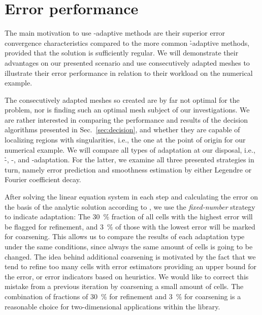 \section{Error performance}
\label{sec:errorvsperformance}



The main motivation to use \hp-adaptive methods are their superior error convergence characteristics compared to the more common \h-adaptive methods, provided that the solution is sufficiently regular. We will demonstrate their advantages on our presented scenario and use consecutively adapted meshes to illustrate their error performance in relation to their workload on the numerical example.


The consecutively adapted meshes so created are by far not optimal for the problem, nor is finding such an optimal mesh subject of our investigations. We are rather interested in comparing the performance and results of the decision algorithms presented in Sec.~\ref{sec:decision}, and whether they are capable of localizing regions with singularities, i.e., the one at the point of origin for our numerical example. We will compare all types of adaptation at our disposal, i.e., \h-, \p-, and \hp-adaptation. For the latter, we examine all three presented strategies in turn, namely error prediction and smoothness estimation by either Legendre or Fourier coefficient decay.

After solving the linear equation system in each step and calculating the error on the basis of the analytic solution according to \textcite{kelly1983,davydov2017}, we use the \textit{fixed-number} strategy to indicate adaptation: The \SI{30}{\percent} fraction of all cells with the highest error will be flagged for refinement, and \SI{3}{\percent} of those with the lowest error will be marked for coarsening. This allows us to compare the results of each adaptation type under the same conditions, since always the same amount of cells is going to be changed. The idea behind additional coarsening is motivated by the fact that we tend to refine too many cells with error estimators providing an upper bound for the error, or error indicators based on heuristics. We would like to correct this mistake from a previous iteration by coarsening a small amount of cells. The combination of fractions of \SI{30}{\percent} for refinement and \SI{3}{\percent} for coarsening is a reasonable choice for two-dimensional applications within the \dealii{} library.

